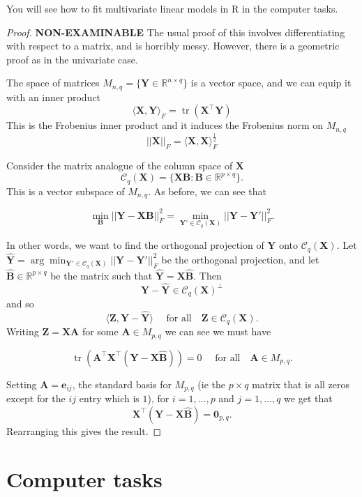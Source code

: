 \documentclass[
]{book}
\theoremstyle{definition}
\theoremstyle{definition}
\theoremstyle{definition}
\theoremstyle{definition}
\theoremstyle{remark}
\begin{document}
You will see how to fit multivariate linear models in R in the computer tasks.

\begin{proof}
\textbf{NON-EXAMINABLE}
The usual proof of this involves differentiating with respect to a matrix, and is horribly messy. However, there is a geometric proof as in the univariate case.

The space of matrices \(M_{n,q} = \{\mathbf Y\in \mathbb{R}^{n \times q} \}\) is a vector space, and we can equip it with an inner product
\[\langle \mathbf X, \mathbf Y\rangle_F = \operatorname{tr}(\mathbf X^\top \mathbf Y)\]
This is the Frobenius inner product and it induces the Frobenius norm on \(M_{n,q}\)
\[||\mathbf X||_F = \langle \mathbf X, \mathbf X\rangle_F^{\frac{1}{2}}\]

Consider the matrix analogue of the column space of \(\mathbf X\)
\[\mathcal{C}_q(\mathbf X)  =\{\mathbf X\mathbf B: \mathbf B\in \mathbb{R}^{p\times q}\}.\]
This is a vector subspace of \(M_{n,q}\). As before, we can see that

\[\min_{\mathbf B} ||\mathbf Y-\mathbf X\mathbf B||_F^2=\min_{\mathbf Y' \in \mathcal{C}_q(\mathbf X)} ||\mathbf Y- \mathbf Y'||_F^2.\]

In other words, we want to find the orthogonal projection of \(\mathbf Y\) onto \(\mathcal{C}_q(\mathbf X)\). Let \(\hat{\mathbf Y} = \arg \min_{\mathbf Y' \in \mathcal{C}_q(\mathbf X)} ||\mathbf Y- \mathbf Y'||_F^2\) be the orthogonal projection, and let \(\hat{\mathbf B}\in \mathbb{R}^{p \times q}\) be the matrix such that \(\hat{\mathbf Y}=\mathbf X\hat{\mathbf B}\). Then
\[\mathbf Y-\hat{\mathbf Y} \in \mathcal{C}_q(\mathbf X)^\perp\]
and so
\[\langle \mathbf Z, \mathbf Y-\hat{\mathbf Y}\rangle \quad \mbox{ for all}\quad \mathbf Z\in \mathcal{C}_q(\mathbf X).\]
Writing \(\mathbf Z= \mathbf X\mathbf A\) for some \(\mathbf A\in M_{p,q}\) we can see we must have

\[\operatorname{tr}(\mathbf A^\top \mathbf X^\top(\mathbf Y-\mathbf X\hat{\mathbf B}))=0 \quad \mbox{ for all}\quad \mathbf A\in M_{p,q}.\]

Setting \(\mathbf A=\mathbf e_{ij}\), the standard basis for \(M_{p,q}\) (ie the \(p\times q\) matrix that is all zeros except for the \(ij\) entry which is \(1\)), for \(i=1,\ldots, p\) and \(j=1, \ldots,q\) we get that
\[\mathbf X^\top(\mathbf Y-\mathbf X\hat{\mathbf B})={\boldsymbol 0}_{p,q}.\]
Rearranging this gives the result.
\end{proof}

\section{Computer tasks}\label{computer-tasks-6}
\end{document}

